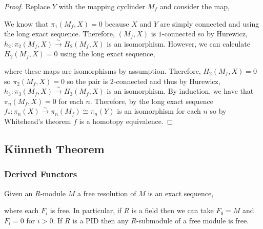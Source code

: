\documentclass[12pt]{extarticle}
\theoremstyle{definition}
\newenvironment{definition}[1][Definition:]{\begin{trivlist}
\item[\hskip \labelsep {\bfseries #1}]}{\end{trivlist}}
\begin{document}
\begin{proof}
Replace $Y$ with the mapping cyclinder $M_f$ and consider the map,
\begin{center}
\end{center}
We know that $\pi_1(M_f, X) = 0$ because $X$ and $Y$ are simply connected and using the long exact sequence. Therefore, $(M_f, X)$ is $1$-connected so by Hurewicz, $h_2 : \pi_2(M_f, X) \xrightarrow{\sim} H_2(M_f, X)$ is an isomorphism. However, we can calculate $H_2(M_f, X) = 0$ using the long exact sequence,
\begin{center}
\end{center}
where these maps are isomorphisms by assumption. Therefore, $H_2(M_f, X) = 0$ so $\pi_2(M_f, X) = 0$ so the pair is $2$-connected and thus by Hurewicz, $h_3 : \pi_3(M_f, X) \xrightarrow{\sim} H_3(M_f, X)$ is an isomorphism. By induction, we have that $\pi_n(M_f, X) = 0$ for each $n$. Therefore, by the long exact sequence $f_* : \pi_n(X) \xrightarrow{\sim} \pi_n(M_f) \cong \pi_n(Y)$ is an isomorphism for each $n$ so by Whitehead's theorem $f$ is a homotopy equivalence.
\end{proof}

 

\subsection{K\"{u}nneth Theorem}

\subsubsection{Derived Functors}

\begin{definition}
Given an $R$-module $M$ a free resolution of $M$ is an exact sequence,
\begin{center}
\end{center}
where each $F_i$ is free. In particular, if $R$ is a field then we can take $F_0 = M$ and $F_i = 0$ for $i > 0$. If $R$ is a PID then any $R$-submodule of a free module is free. 
\end{definition}
\end{document}
